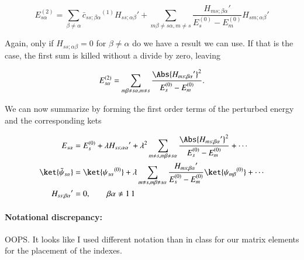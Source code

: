 \begin{equation}\label{eqn:qmTwoL5a:700}
E_{s \alpha}^{(2)} 
=
\sum_{\beta \ne \alpha} {\bar{c}_{ss ; \beta \alpha}}^{(1)} {H_{ss ; \alpha \beta}}'
+
\sum_{m \beta \ne s \alpha, m \ne s} 
\frac{{H_{ms ; \beta \alpha}}' }
{ E_s^{(0)} - E_m^{(0)} }
{H_{sm ; \alpha \beta}}'
\end{equation}

Again, only if $H_{ss ; \alpha \beta} = 0$ for $\beta \ne \alpha$ do we have a result we can use.  If that is the case, the first sum is killed without a divide by zero, leaving

\begin{equation}\label{eqn:qmTwoL5a:700b}
E_{s \alpha}^{(2)} 
=
\sum_{m \beta \ne s \alpha, m \ne s} 
\frac{\Abs{{H_{ms ; \beta \alpha}}'}^2 }
{ E_s^{(0)} - E_m^{(0)} }.
\end{equation}

We can now summarize by forming the first order terms of the perturbed energy and the corresponding kets

\begin{align}\label{eqn:qmTwoL5a:720}
E_{s \alpha} &= E_s^{(0)} + \lambda {H_{ss ; \alpha \alpha}}' + \lambda^2 
\sum_{m \ne s, m \beta \ne s \alpha} 
\frac{\Abs{{H_{ms ; \beta \alpha}}'}^2 }
{ E_s^{(0)} - E_m^{(0)} } 
+ \cdots
\\
\ket{\bar{\psi}_{s \alpha}} &= \ket{{\psi_{s \alpha}}^{(0)}} + \lambda
\sum_{m \ne s, m \beta \ne s \alpha} 
\frac{{H_{ms ; \beta \alpha}}'}
{ E_s^{(0)} - E_m^{(0)} } \ket{{\psi_{m \beta}}^{(0)}}
+ \cdots \\
{H_{ss ; \beta \alpha}}' &= 0, \qquad \beta \alpha \ne 1\,1
\end{align}

\paragraph{Notational discrepancy:} OOPS.  It looks like I used different notation than in class for our matrix elements for the placement of the indexes.

